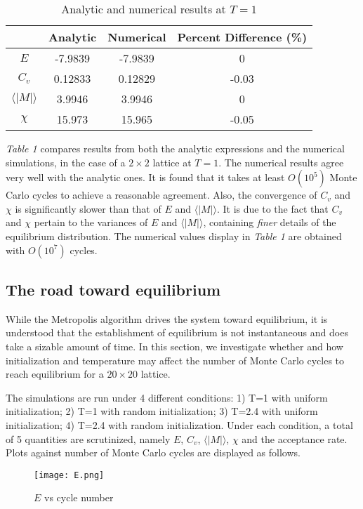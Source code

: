 \documentclass{article}
\begin{document}
\begin{table}[ht]
\caption{Analytic and numerical results at $T=1$}
\centering
\begin{tabular}{c c c c}
\hline\hline
 & Analytic & Numerical & Percent Difference (\%) \\
 \hline
 $E$ & -7.9839 & -7.9839 & 0 \\
 $C_v$ & 0.12833 & 0.12829 & -0.03 \\
  $\langle|M|\rangle$ & 3.9946 & 3.9946 & 0 \\
 $\chi$ & 15.973 & 15.965 & -0.05 \\
 \hline
\end{tabular}
\end{table}

\emph{Table 1} compares results from both the analytic expressions and the numerical simulations, in the case of a $2\times2$ lattice at $T=1$. The numerical results agree very well with the analytic ones. It is found that it takes at least $O(10^5)$ Monte Carlo cycles to achieve a reasonable agreement. Also, the convergence of $C_v$ and $\chi$ is significantly slower than that of $E$ and  $\langle|M|\rangle$. It is due to the fact that $C_v$ and $\chi$ pertain to the variances of $E$ and  $\langle|M|\rangle$, containing \emph{finer} details of the equilibrium distribution. The numerical values display in \emph{Table 1} are obtained with $O(10^7)$ cycles.

\subsection{The road toward equilibrium}
While the Metropolis algorithm drives the system toward equilibrium, it is understood that the establishment of equilibrium is not instantaneous and does take a sizable amount of time. In this section, we investigate whether and how initialization and temperature may affect the number of Monte Carlo cycles to reach equilibrium for a $20\times20$ lattice. 

The simulations are run under 4 different conditions: 1) T=1 with uniform initialization; 2) T=1 with random initialization; 3) T=2.4 with uniform initialization; 4) T=2.4 with random initialization. Under each condition, a total of 5 quantities are scrutinized, namely $E$, $C_v$, $\langle|M|\rangle$, $\chi$ and the acceptance rate. Plots against number of Monte Carlo cycles are displayed as follows.

\begin{figure}[h]
\begin{center}
\texttt{[image: E.png]}
\caption{$E$ vs cycle number}
\end{center}
\end{figure}
\end{document}
